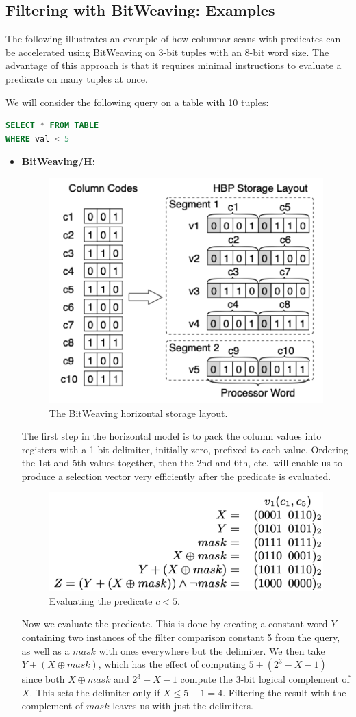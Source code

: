 \documentclass[11pt]{article}
\begin{document}
\subsection{Filtering with BitWeaving: Examples}
The following illustrates an example of how columnar scans with predicates can be accelerated using BitWeaving on 3-bit tuples with an 8-bit word size. The advantage of this approach is that it requires minimal instructions to evaluate a predicate on many tuples at once.

We will consider the following query on a table with 10 tuples:
\begin{lstlisting}[language=SQL]
SELECT * FROM TABLE
WHERE val < 5
\end{lstlisting}

\begin{itemize}
    \item \textbf{BitWeaving/H:}
    \begin{figure}[H]
    \centering
    \includegraphics[width=0.5\linewidth]{fig/horiz-layout.pdf}
    \caption{The BitWeaving horizontal storage layout.}\label{fig:horiz-layout}
    \end{figure}
    The first step in the horizontal model is to pack the column values into registers with a 1-bit delimiter, initially zero, prefixed to each value. Ordering the 1st and 5th values together, then the 2nd and 6th, etc.\ will enable us to produce a selection vector very efficiently after the predicate is evaluated.
    \begin{figure}[H]
    \centering
    \includegraphics[width=0.5\linewidth]{fig/horiz-procedure.pdf}
    \caption{Evaluating the predicate $c < 5$.}\label{fig:horiz-procedure}
    \end{figure}
    Now we evaluate the predicate. This is done by creating a constant word $Y$ containing two instances of the filter comparison constant 5 from the query, as well as a $mask$ with ones everywhere but the delimiter. We then take $Y + (X \oplus mask)$, which has the effect of computing $5 + (2^3 - X - 1)$ since both $X\oplus mask$ and $2^3-X-1$ compute the 3-bit logical complement of $X$. This sets the delimiter only if $X \leq 5-1=4$. Filtering the result with the complement of $mask$ leaves us with just the delimiters.


\end{itemize}
\end{document}
